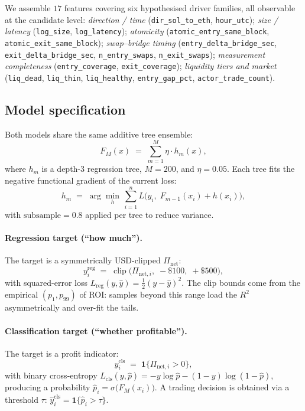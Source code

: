 \documentclass[sigconf,nonacm,10pt]{acmart}
\newcommand{\Pnet}{\Pi_{\text{net}}}
\begin{document}
We assemble $17$ features covering six hypothesised driver families,
all observable at the candidate level:
\emph{direction / time} (\texttt{dir\_sol\_to\_eth}, \texttt{hour\_utc});
\emph{size / latency} (\texttt{log\_size}, \texttt{log\_latency});
\emph{atomicity} (\texttt{atomic\_entry\_same\_block},
\texttt{atomic\_exit\_same\_block});
\emph{swap--bridge timing} (\texttt{entry\_delta\_bridge\_sec},
\texttt{exit\_delta\_bridge\_sec},
\texttt{n\_entry\_swaps}, \texttt{n\_exit\_swaps});
\emph{measurement completeness} (\texttt{entry\_coverage},
\texttt{exit\_coverage});
\emph{liquidity tiers and market} (\texttt{liq\_dead},
\texttt{liq\_thin}, \texttt{liq\_healthy}, \texttt{entry\_gap\_pct},
\texttt{actor\_trade\_count}).

\subsection{Model specification}

Both models share the same additive tree ensemble:
\begin{equation}
F_M(x) \;=\; \sum_{m=1}^{M} \eta \cdot h_m(x),
\label{eq:gbm}
\end{equation}
where $h_m$ is a depth-$3$ regression tree, $M=200$, and
$\eta=0.05$. Each tree fits the negative functional gradient of the
current loss:
\begin{equation}
h_m \;=\; \arg\min_{h}\,\sum_{i=1}^{n}
L\!\bigl(y_i,\; F_{m-1}(x_i)+h(x_i)\bigr),
\label{eq:gbm-update}
\end{equation}
with $\text{subsample}=0.8$ applied per tree to reduce variance.

\paragraph{Regression target (``how much'').}
The target is a symmetrically USD-clipped $\Pnet$:
\begin{equation}
y^{\text{reg}}_i \;=\; \operatorname{clip}\!\bigl(\Pi_{\text{net},i},\;
-\$100,\; +\$500\bigr),
\label{eq:reg-target}
\end{equation}
with squared-error loss
$L_{\text{reg}}(y,\hat y)=\tfrac12(y-\hat y)^2$. The clip bounds come
from the empirical $(p_1, p_{99})$ of ROI: samples beyond this range
load the $R^2$ asymmetrically and over-fit the tails.

\paragraph{Classification target (``whether profitable'').}
The target is a profit indicator:
\begin{equation}
y^{\text{cls}}_i \;=\; \mathbf{1}\{\Pi_{\text{net},i}>0\},
\label{eq:cls-target}
\end{equation}
with binary cross-entropy
$L_{\text{cls}}(y,\hat p)=-y\log\hat p-(1-y)\log(1-\hat p)$,
producing a probability
$\hat p_i=\sigma\!\bigl(F_M(x_i)\bigr)$. A trading decision is
obtained via a threshold $\tau$:
$\hat y^{\text{cls}}_i=\mathbf{1}\{\hat p_i>\tau\}$.
\end{document}
